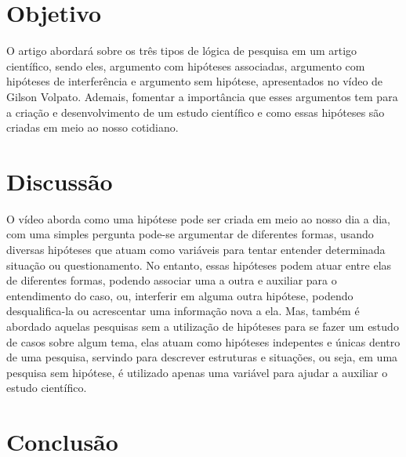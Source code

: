 \section{\esp Objetivo}

O artigo abordará sobre os três tipos de lógica de pesquisa em um artigo científico, sendo eles, argumento com hipóteses associadas, argumento com hipóteses de interferência e argumento sem hipótese, apresentados no vídeo de Gilson Volpato. Ademais, fomentar a importância que esses argumentos tem para a criação e desenvolvimento de um estudo científico e como essas hipóteses são criadas em meio ao nosso cotidiano.

\section{\esp Discussão}

O vídeo aborda como uma hipótese pode ser criada em meio ao nosso dia a dia, com uma simples pergunta pode-se argumentar de diferentes formas, usando diversas hipóteses que atuam como variáveis para tentar entender determinada situação ou questionamento. No entanto, essas hipóteses podem atuar entre elas de diferentes formas, podendo associar uma a outra e auxiliar para o entendimento do caso, ou, interferir em alguma outra hipótese, podendo desqualifica-la ou acrescentar uma informação nova a ela. Mas, também é abordado aquelas pesquisas sem a utilização de hipóteses para se fazer um estudo de casos sobre algum tema, elas atuam como hipóteses indepentes e únicas dentro de uma pesquisa, servindo para descrever estruturas e situações, ou seja, em uma pesquisa sem hipótese, é utilizado apenas uma variável para ajudar a auxiliar o estudo científico.

\section{\esp Conclusão}


